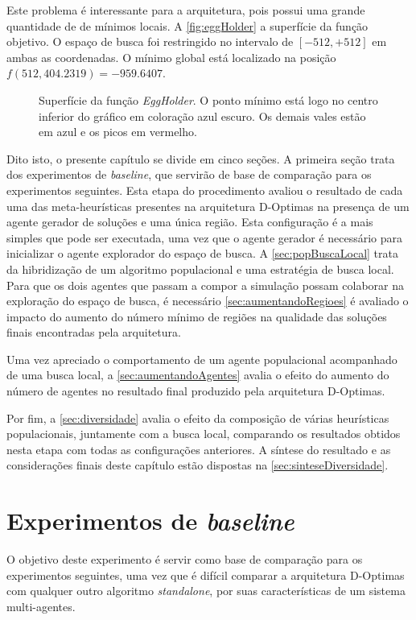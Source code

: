 Este problema é interessante para a arquitetura, pois possui uma grande quantidade de de mínimos locais. A \autoref{fig:eggHolder} a superfície da função objetivo. O espaço de busca foi restringido no intervalo de $[-512,+512]$ em ambas as coordenadas. O mínimo global está localizado na posição $f(512, 404.2319) = -959.6407$.   

\begin{figure}
    \centering
    \caption{Superfície da função \textit{EggHolder}. O ponto mínimo está logo no centro inferior do gráfico em coloração azul escuro. Os demais vales estão em azul e os picos em vermelho.}
    
    \label{fig:eggHolder}
\end{figure}

Dito isto, o presente capítulo se divide em cinco seções. A primeira seção trata dos experimentos de \textit{baseline}, que servirão de base de comparação para os experimentos seguintes. Esta etapa do procedimento avaliou o resultado de cada uma das meta-heurísticas presentes na arquitetura D-Optimas na presença de um agente gerador de soluções e uma única região. Esta configuração é a mais simples que pode ser executada, uma vez que o agente gerador é necessário para inicializar o agente explorador do espaço de busca. A \autoref{sec:popBuscaLocal} trata da hibridização de um algoritmo populacional e uma estratégia de busca local. Para que os dois agentes que passam a compor a simulação possam colaborar na exploração do espaço de busca, é necessário \autoref{sec:aumentandoRegioes} é avaliado o impacto do aumento do número mínimo de regiões na qualidade das soluções finais encontradas pela arquitetura.

Uma vez apreciado o comportamento de um agente populacional acompanhado de uma busca local, a \autoref{sec:aumentandoAgentes} avalia o efeito do aumento do número de agentes no resultado final produzido pela arquitetura D-Optimas. 

Por fim, a \autoref{sec:diversidade} avalia o efeito da composição de várias heurísticas populacionais, juntamente com a busca local, comparando os resultados obtidos nesta etapa com todas as configurações anteriores. A síntese do resultado e as considerações finais deste capítulo estão dispostas na \autoref{sec:sinteseDiversidade}.

\section{Experimentos de \textit{baseline}}
\label{sec:baseline}
O objetivo deste experimento é servir como base de comparação para os experimentos seguintes, uma vez que é difícil comparar a arquitetura D-Optimas com qualquer outro algoritmo \textit{standalone}, por suas características de um sistema multi-agentes.

